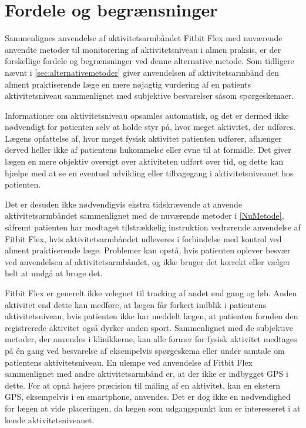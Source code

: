 \section{Fordele og begrænsninger}\label{sec:tek_fordelebegr}
Sammenlignes anvendelse af aktivitetsarmbåndet Fitbit Flex med nuværende anvendte metoder til monitorering af aktivitetsniveau i almen praksis, er der forskellige fordele og begrænsninger ved denne alternative metode. Som tidligere nævnt i \autoref{sec:alternativemetoder} giver anvendelsen af aktivitetsarmbånd den alment praktiserende læge en mere nøjagtig vurdering af en patients aktivitetsniveau sammenlignet med subjektive besvarelser såsom spørgeskemaer.

Informationer om aktivitetsniveau opsamles automatisk, og det er dermed ikke nødvendigt for patienten selv at holde styr på, hvor meget aktivitet, der udføres. Lægens opfattelse af, hvor meget fysisk aktivitet patienten udfører, afhænger derved heller ikke af patientens hukommelse eller evne til at formidle. Det giver lægen en mere objektiv oversigt over aktiviteten udført over tid, og dette kan hjælpe med at se en eventuel udvikling eller tilbagegang i aktivitetsniveauet hos patienten. 

Det er desuden ikke nødvendigvis ekstra tidskrævende at anvende aktivitetsarmbåndet sammenlignet med de nuværende metoder i \autoref{NuMetode}, såfremt patienten har modtaget tilstrækkelig instruktion vedrørende anvendelse af Fitbit Flex, hvis aktivitetsarmbåndet udleveres i forbindelse med kontrol ved alment praktiserende læge. Problemer kan opstå, hvis patienten oplever besvær ved anvendelsen af aktivitetsarmbåndet, og ikke bruger det korrekt eller vælger helt at undgå at bruge det.

Fitbit Flex er generelt ikke velegnet til tracking af andet end gang og løb. Anden aktivitet end dette kan medføre, at lægen får forkert indblik i patientens aktivitetsniveau, hvis patienten ikke har meddelt lægen, at patienten foruden den registrerede aktivitet også dyrker anden sport. Sammenlignet med de subjektive metoder, der anvendes i klinikkerne, kan alle former for fysisk aktivitet medtages på én gang ved besvarelse af eksempelvis spørgeskema eller under samtale om patientens aktivitetsniveau.
En ulempe ved anvendelse af Fitbit Flex sammenlignet med andre aktivitetsarmbånd er, at der ikke er indbygget GPS i dette. For at opnå højere præcision til måling af en aktivitet, kan en ekstern GPS, eksempelvis i en smartphone, anvendes. Det er dog ikke en nødvendighed for lægen at vide placeringen, da lægen som udgangspunkt kun er interesseret i at kende aktivitetsniveauet.

